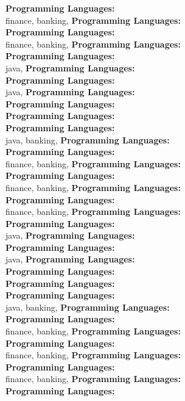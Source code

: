 \textbf{Programming Languages:} \\
finance, banking, \textbf{Programming Languages:} \\
\textbf{Programming Languages:} \\
finance, banking, \textbf{Programming Languages:} \\
\textbf{Programming Languages:} \\
java, \textbf{Programming Languages:} \\
\textbf{Programming Languages:} \\
java, \textbf{Programming Languages:} \\
\textbf{Programming Languages:} \\
\textbf{Programming Languages:} \\
\textbf{Programming Languages:} \\
java, banking, \textbf{Programming Languages:} \\
\textbf{Programming Languages:} \\
finance, banking, \textbf{Programming Languages:} \\
\textbf{Programming Languages:} \\
finance, banking, \textbf{Programming Languages:} \\
\textbf{Programming Languages:} \\
finance, banking, \textbf{Programming Languages:} \\
\textbf{Programming Languages:} \\
java, \textbf{Programming Languages:} \\
\textbf{Programming Languages:} \\
java, \textbf{Programming Languages:} \\
\textbf{Programming Languages:} \\
\textbf{Programming Languages:} \\
\textbf{Programming Languages:} \\
java, banking, \textbf{Programming Languages:} \\
\textbf{Programming Languages:} \\
finance, banking, \textbf{Programming Languages:} \\
\textbf{Programming Languages:} \\
finance, banking, \textbf{Programming Languages:} \\
\textbf{Programming Languages:} \\
finance, banking, \textbf{Programming Languages:} \\
\textbf{Programming Languages:} \\
